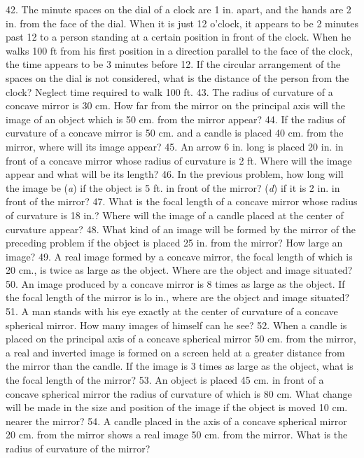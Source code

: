 42. The minute spaces on the dial of a clock are 1 in. apart, and the hands are 2 in. from the face of the dial. When it is just 12 o'clock, it appears to be 2 minutes past 12 to a person standing at a certain position in front of the clock. When he walks 100 ft from his first position in a direction parallel to the face of the clock, the time appears to be 3 minutes before 12. If the circular arrangement of the spaces on the dial is not considered, what is the distance of the person from the clock? Neglect time required to walk 100 ft.
43. The radius of curvature of a concave mirror is 30 cm. How far from the mirror on the principal axis will the image of an object which is 50 cm. from the mirror appear?
44. If the radius of curvature of a concave mirror is 50 cm. and a candle is placed 40 cm. from the mirror, where will its image appear?
45. An arrow 6 in. long is placed 20 in. in front of a concave mirror whose radius of curvature is 2 ft. Where will the image appear and what will be its length?
46. In the previous problem, how long will the image be (\emph{a}) if the object is 5 ft. in front of the mirror? (\emph{d}) if it is 2 in. in front of the mirror?
47. What is the focal length of a concave mirror whose radius of curvature is 18 in.? Where will the image of a candle placed at the center of curvature appear?
48. What kind of an image will be formed by the mirror of the preceding problem if the object is placed 25 in. from the mirror? How large an image?
49. A real image formed by a concave mirror, the focal length of which is 20 cm., is twice as large as the object. Where are the object and image situated?
50. An image produced by a concave mirror is 8 times as large as the object. If the focal length of the mirror is lo in., where are the object and image situated?
51. A man stands with his eye exactly at the center of curvature of a concave spherical mirror. How many images of himself can he see?
52. When a candle is placed on the principal axis of a concave spherical mirror 50 cm. from the mirror, a real and inverted image is formed on a screen held at a greater distance from the mirror than the candle. If the image is 3 times as large as the object, what is the focal length of the mirror?
53. An object is placed 45 cm. in front of a concave spherical mirror the radius of curvature of which is 80 cm. What change will be made in the size and position of the image if the object is moved 10 cm. nearer the mirror?
54. A candle placed in the axis of a concave spherical mirror 20 cm. from the mirror shows a real image 50 cm. from the mirror. What is the radius of curvature of the mirror?
